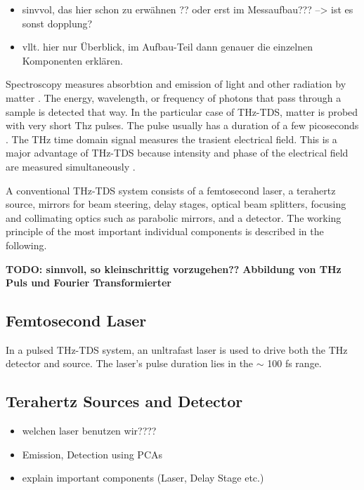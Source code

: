 \begin{itemize}
	\item sinvvol, das hier schon zu erwähnen ?? oder erst im Messaufbau??? --> ist es sonst dopplung?
	\item vllt. hier nur Überblick, im Aufbau-Teil dann genauer die einzelnen Komponenten erklären.
\end{itemize}

Spectroscopy measures absorbtion and emission of light and other radiation by matter \cite{atascientificUnderstandingSpectrometrySpectroscopy2020}. The energy, wavelength, or frequency of photons that pass through a sample is detected that way. In the particular case of THz-TDS, matter is probed with very short Thz pulses.
The pulse usually has a duration of a few picoseconds \cite{neuTutorialIntroductionTerahertz2018}. The THz time domain signal measures the trasient electrical field. This is a major advantage of THz-TDS because intensity and phase of the electrical field are measured simultaneously \cite{zhaoPrincipleTerahertzTimeDomain2023}.

A conventional THz-TDS system consists of a femtosecond laser, a terahertz source, mirrors for beam steering, delay stages, optical beam splitters, focusing and collimating optics such as parabolic mirrors, and a detector. The working principle of the most important individual components is described in the following. 

\textbf{TODO: sinnvoll, so kleinschrittig vorzugehen??}
\textbf{Abbildung von THz Puls und Fourier Transformierter}


\subsection{Femtosecond Laser}
In a pulsed THz-TDS system, an unltrafast laser is used to drive both the THz detector and source. The laser's pulse duration lies in the $\sim$ \num{100} \si{\femto\s} range. 

\subsection{Terahertz Sources and Detector}

\begin{itemize}
	\item welchen laser benutzen wir????
\end{itemize}

\begin{itemize}
	\item Emission, Detection using PCAs 
	\item explain important components (Laser, Delay Stage etc.)
\end{itemize}